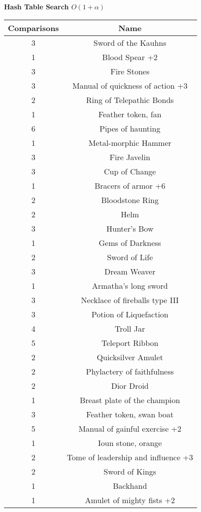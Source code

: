 \documentclass[letterpaper, 10pt]{article}
\begin{document}
\begin{center}
    \bf{Hash Table Search $O(1 + \alpha)$}\\
    \begin{tabular}{|| c c ||}
    \hline
    \bf{Comparisons} & \bf{Name} \\
    \hline
    3  & Sword of the Kauhns\\
    1  & Blood Spear +2\\
    3  & Fire Stones\\
    3  & Manual of quickness of action +3\\
    2  & Ring of Telepathic Bonds\\
    1  & Feather token, fan\\
    6  & Pipes of haunting\\
    1  & Metal-morphic Hammer\\
    3  & Fire Javelin\\
    3  & Cup of Change\\
    1  & Bracers of armor +6\\
    2  & Bloodstone Ring\\
    2  & Helm\\
    3  & Hunter's Bow\\
    1  & Gems of Darkness\\
    2  & Sword of Life\\
    3  & Dream Weaver\\
    1  & Armatha's long sword\\
    3  & Necklace of fireballs type III\\
    3  & Potion of Liquefaction\\
    4  & Troll Jar\\
    5  & Teleport Ribbon\\
    2  & Quicksilver Amulet\\
    2  & Phylactery of faithfulness\\
    2  & Dior Droid\\
    1  & Breast plate of the champion\\
    3  & Feather token, swan boat\\
    5  & Manual of gainful exercise +2\\
    1  & Ioun stone, orange\\
    2  & Tome of leadership and influence +3\\
    2  & Sword of Kings\\
    1  & Backhand\\
    1  & Amulet of mighty fists +2\\

\end{tabular}
\end{center}
\end{document}
